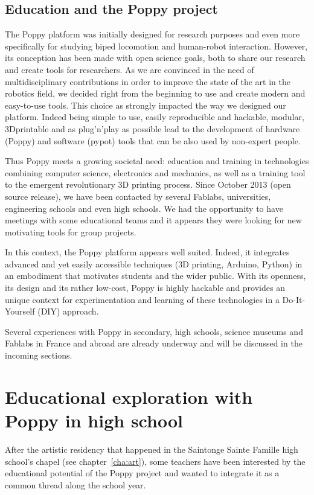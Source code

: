 \subsection{Education and the Poppy project} %

The Poppy platform was initially designed for research purposes and even more specifically for studying biped locomotion and human-robot interaction. However, its conception has been made with open science goals, both to share our research and create tools for researchers. As we are convinced in the need of multidisciplinary contributions in order to improve the state of the art in the robotics field, we decided right from the beginning to use and create modern and easy-to-use tools. This choice as strongly impacted the way we designed our platform. Indeed being simple to use, easily reproducible and hackable, modular, 3Dprintable and as plug'n'play as possible lead to the development of hardware (Poppy) and software (pypot) tools that can be also used by non-expert people.

Thus Poppy meets a growing societal need: education and training in technologies combining computer science, electronics and mechanics, as well as a training tool to the emergent revolutionary 3D printing process. Since October 2013 (open source release), we have been contacted by several Fablabs, universities, engineering schools and even high schools. We had the opportunity to have meetings with some educational teams and it appears they were looking for new motivating tools for group projects.

In this context, the Poppy platform appears well suited. Indeed, it integrates advanced and yet easily accessible techniques (3D printing, Arduino, Python) in an embodiment that motivates students and the wider public. With its openness, its design and its rather low-cost, Poppy is highly hackable and provides an unique context for experimentation and learning of these technologies in a Do-It-Yourself (DIY) approach.

Several experiences with Poppy in secondary, high schools, science museums and Fablabs in France and abroad are already underway and will be discussed in the incoming sections.


\section{Educational exploration with Poppy in high school} %

After the artistic residency that happened in the Saintonge Sainte Famille high school's chapel (see chapter~\ref{cha:art}), some teachers have been interested by the educational potential of the Poppy project and wanted to integrate it as a common thread along the school year.

